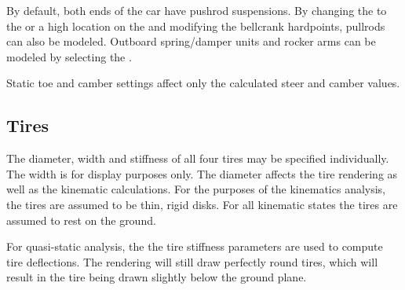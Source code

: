 By default, both ends of the car have pushrod suspensions.  By changing the  to the  or a high location on the  and modifying the bellcrank hardpoints, pullrods can also be modeled.  Outboard spring/damper units and rocker arms can be modeled by selecting the  .

Static toe and camber settings affect only the calculated steer and camber values.

\subsection{Tires} \label{ssec:tires}

The diameter, width and stiffness of all four tires may be specified individually.  The width is for display purposes only.  The diameter affects the tire rendering as well as the kinematic calculations.  For the purposes of the kinematics analysis, the tires are assumed to be thin, rigid disks.  For all kinematic states the tires are assumed to rest on the ground.

For quasi-static analysis, the the tire stiffness parameters are used to compute tire deflections.  The rendering will still draw perfectly round tires, which will result in the tire being drawn slightly below the ground plane.
